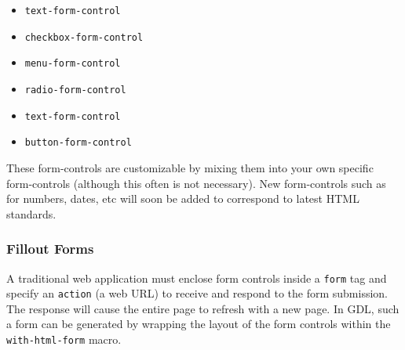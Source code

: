 \documentclass [11pt]{book}
\begin{document}
\begin{itemize}

\item \texttt{text-form-control}

\item \texttt{checkbox-form-control}

\item \texttt{menu-form-control}

\item \texttt{radio-form-control}

\item \texttt{text-form-control}

\item \texttt{button-form-control}

\end{itemize}





These form-controls are customizable by mixing them into
	   your own specific form-controls (although this often is not
	   necessary). New form-controls such as for numbers, dates,
	   etc will soon be added to correspond to latest HTML
	   standards.



\subsubsection{Fillout Forms}

\label{subsubsec:filloutforms}



A traditional web application must enclose form controls inside a \texttt{form} tag and specify an \texttt{action} (a web URL) to receive and respond to the 
form submission. The response will cause the entire page to refresh with
a new page. In GDL, such a form can be generated by wrapping the layout
of the form controls within the \texttt{with-html-form} macro.
\end{document}
